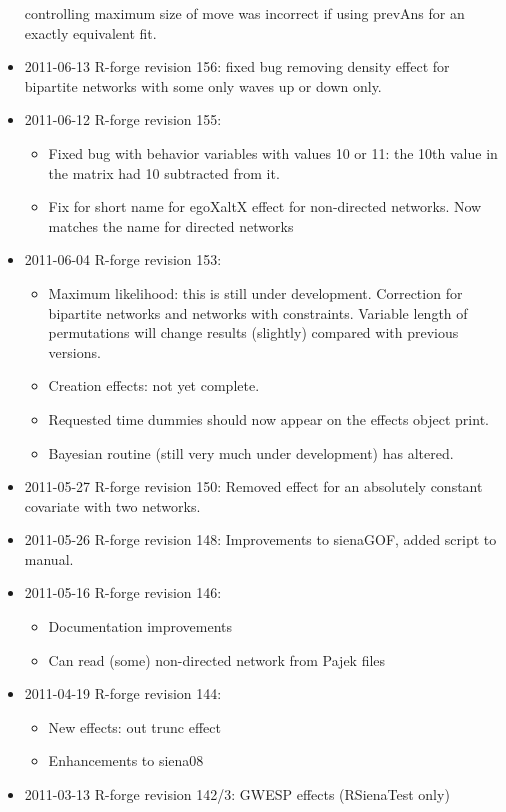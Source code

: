 \documentclass[a4paper,fleqn,11pt]{article}
\newcommand{\+}{\, + \,}
\begin{document}
\begin{small}
\begin{itemize}
  controlling maximum size of move was incorrect if using prevAns for an exactly
  equivalent fit.
\item 2011-06-13 R-forge revision 156: fixed bug removing density effect for
  bipartite networks with some only waves up or down only.
\item 2011-06-12 R-forge revision 155:
\begin{itemize}
\item Fixed bug with behavior variables with values 10 or 11: the 10th value in
  the matrix had 10 subtracted from it.
\item Fix for short name for egoXaltX effect for non-directed networks. Now
  matches the name for directed networks
\end{itemize}
\item 2011-06-04 R-forge revision 153:
\begin{itemize}
\item Maximum likelihood: this is still under development. Correction for
  bipartite networks and networks with constraints. Variable length of
  permutations will change results (slightly) compared with previous versions.
\item Creation effects: not yet complete.
\item Requested time dummies should now appear on the effects object print.
\item Bayesian routine (still very much under development) has altered.
\end{itemize}
\item 2011-05-27 R-forge revision 150: Removed effect for an absolutely constant
  covariate with two networks.
\item 2011-05-26 R-forge revision 148:
Improvements to sienaGOF, added script to manual.
\item 2011-05-16 R-forge revision 146:
\begin{itemize}
\item Documentation improvements
\item Can read (some) non-directed network from Pajek files
\end{itemize}
\item 2011-04-19 R-forge revision 144:
\begin{itemize}
\item New effects: out trunc effect
\item Enhancements to siena08
\end{itemize}
\item 2011-03-13 R-forge revision 142/3: GWESP effects (RSienaTest only)

\end{itemize}
\end{small}
\end{document}
